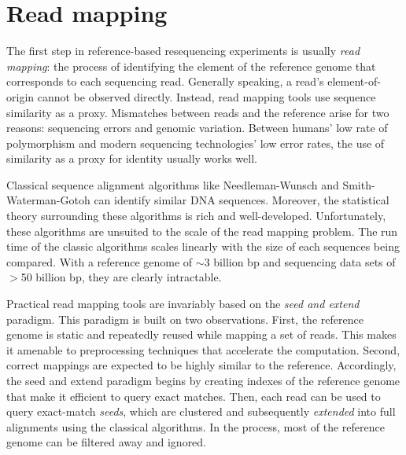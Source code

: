 \documentclass[11pt]{ucthesis}
\begin{document}
\section{Read mapping}

The first step in reference-based resequencing experiments is usually \emph{read mapping}: the process of identifying the element of the reference genome that corresponds to each sequencing read. Generally speaking, a read's element-of-origin cannot be observed directly. Instead, read mapping tools use sequence similarity as a proxy. Mismatches between reads and the reference arise for two reasons: sequencing errors and genomic variation. Between humans' low rate of polymorphism and modern sequencing technologies' low error rates, the use of similarity as a proxy for identity usually works well.

Classical sequence alignment algorithms like Needleman-Wunsch\cite{needleman1970general} and Smith-Waterman-Gotoh\cite{smith1981comparison,gotoh1982improved} can identify similar DNA sequences. Moreover, the statistical theory surrounding these algorithms is rich and well-developed\cite{karlin1990methods,states1991improved}. Unfortunately, these algorithms are unsuited to the scale of the read mapping problem. The run time of the classic algorithms scales linearly with the size of each sequences being compared. With a reference genome of $\sim$3 billion bp and sequencing data sets of $>$50 billion bp, they are clearly intractable.

Practical read mapping tools are invariably based on the \emph{seed and extend} paradigm. This paradigm is built on two observations. First, the reference genome is static and repeatedly reused while mapping a set of reads. This makes it amenable to preprocessing techniques that accelerate the computation. Second, correct mappings are expected to be highly similar to the reference. Accordingly, the seed and extend paradigm begins by creating indexes of the reference genome that make it efficient to query exact matches. Then, each read can be used to query exact-match \emph{seeds}, which are clustered and subsequently \emph{extended} into full alignments using the classical algorithms. In the process, most of the reference genome can be filtered away and ignored.
\end{document}
